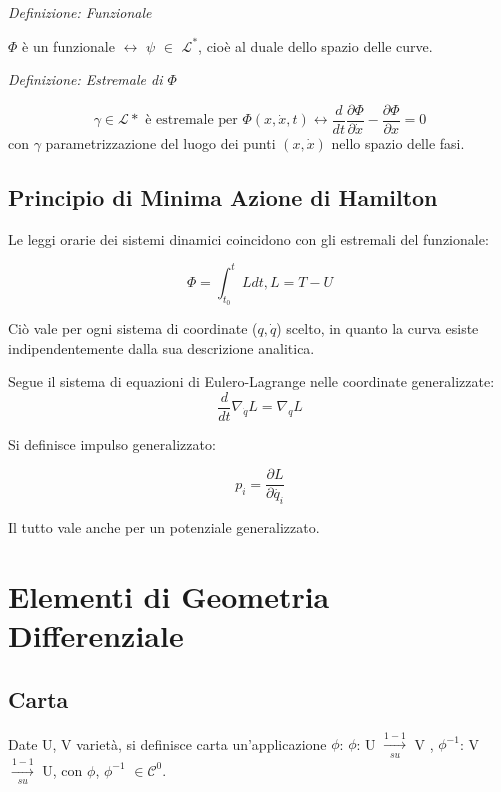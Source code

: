\documentclass{article}
\begin{document}
\textit{Definizione: Funzionale}

$\Phi$ è un funzionale $\leftrightarrow$ $\psi$ $\in$ $\mathcal{L^*}$, cioè al duale dello spazio delle curve.


\textit{Definizione: Estremale di $\Phi$}

\begin{equation}
    \gamma \in \mathcal{L*} \text{ è estremale per } \Phi(x,\dot{x},t) \leftrightarrow \frac{d}{dt} \frac{\partial \Phi }{\partial \dot{x}} - \frac{\partial \Phi }{\partial x} = 0
\end{equation}
con $\gamma$ parametrizzazione del luogo dei punti $(x,\dot{x})$ nello spazio delle fasi.

\subsection{Principio di Minima Azione di Hamilton}

Le leggi orarie dei sistemi dinamici coincidono con gli estremali del funzionale:

\begin{equation}
    \Phi = \int_{t_0}^{t} L dt , L=T-U
\end{equation}

Ciò vale per ogni sistema di coordinate ($q, \dot q$) scelto, in quanto la curva esiste indipendentemente dalla sua descrizione analitica.

Segue il sistema di equazioni di Eulero-Lagrange nelle coordinate generalizzate:
\begin{equation}
    \frac{d}{dt}\nabla_{\dot{q}}L= \nabla_{q}L
\end{equation}

Si definisce impulso generalizzato:

\begin{equation}
    p_i= \frac{\partial L}{\partial \dot{q_i}}
\end{equation}

Il tutto vale anche per un potenziale generalizzato.

\section{Elementi di Geometria Differenziale}

\subsection{Carta}
Date U, V varietà,  si definisce carta un'applicazione $\phi$: $\phi$: U $\xrightarrow[su]{1-1}$ V , $\phi^{-1}$: V $\xrightarrow[su]{1-1}$ U, con $\phi$, $\phi^{-1}$ $\in$$ \mathcal{C}^0$.
\end{document}
